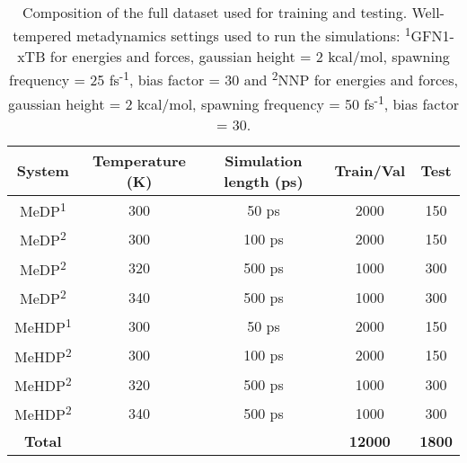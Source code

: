 \begin{table}[htbp]
    \centering
    \caption{Composition of the full dataset used for training and testing. Well-tempered metadynamics settings used to run the simulations: \textsuperscript{1}GFN1-xTB for energies and forces, gaussian height = 2 kcal/mol, spawning frequency = 25 fs\textsuperscript{-1}, bias factor = 30 and  \textsuperscript{2}NNP for energies and forces, gaussian height = 2 kcal/mol, spawning frequency = 50 fs\textsuperscript{-1}, bias factor = 30.}
    \label{tab:full_dataset}
    \begin{tabular}{ccccc}
    \toprule
    \textbf{System} & \textbf{Temperature (K)} & \textbf{Simulation length (ps)} & \textbf{Train/Val} & \textbf{Test} \\
    \midrule
    MeDP\textsuperscript{1}  & 300 & 50 ps   & 2000 & 150 \\
    MeDP\textsuperscript{2}  & 300 & 100 ps & 2000 & 150 \\
    MeDP\textsuperscript{2}  & 320 & 500 ps  & 1000 & 300 \\
    MeDP\textsuperscript{2}  & 340 & 500 ps  & 1000 & 300 \\
    MeHDP\textsuperscript{1} & 300 & 50 ps  & 2000 & 150 \\
    MeHDP\textsuperscript{2} & 300 & 100 ps & 2000 & 150 \\
    MeHDP\textsuperscript{2} & 320 & 500 ps  & 1000 & 300 \\
    MeHDP\textsuperscript{2} & 340 & 500 ps  & 1000 & 300 \\
    \midrule
    \textbf{Total} & & & \textbf{12000} & \textbf{1800} \\
    \bottomrule
    \end{tabular}
\end{table}
